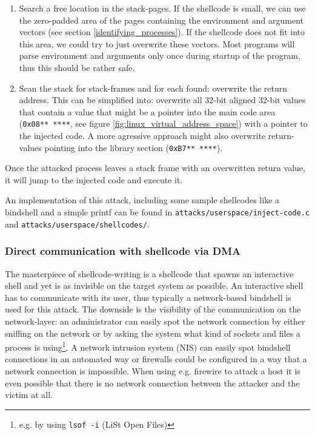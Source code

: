 \begin{enumerate}

	\item Search a free location in the stack-pages. If the shellcode is
		small, we can use the zero-padded area of the pages containing
		the environment and argument vectors (see section
		\ref{identifying_processes}). If the shellcode does not fit into
		this area, we could try to just overwrite these vectors. Most
		programs will parse environment and arguments only once during
		startup of the program, thus this should be rather safe.

	\item Scan the stack for stack-frames and for each found: overwrite the
		return address. This can be simplified into: overwrite all
		32-bit aligned 32-bit values that contain a value that might be
		a pointer into the main code area (\texttt{0x08**~****}, see
		figure \ref{fig:linux_virtual_address_space}) with a pointer to
		the injected code.  A more agressive approach might also
		overwrite return-values pointing into the library section
		(\texttt{0xB7**~****}).

\end{enumerate}

Once the attacked process leaves a stack frame with an overwritten return value,
it will jump to the injected code and execute it.

An implementation of this attack, including some sample shellcodes like a
bindshell and a simple printf can be found in
\texttt{attacks/userspace/inject-code.c} and \linebreak
\texttt{attacks/userspace/shellcodes/}.


\subsubsection{Direct communication with shellcode via DMA}

The masterpiece of shellcode-writing is a shellcode that spawns an interactive
shell and yet is as invisible on the target system as possible. An interactive
shell has to communicate with its user, thus typically a network-based bindshell
is used for this attack. The downside is the visibility of the communication on
the network-layer: an administrator can easily spot the network connection by
either sniffing on the network or by asking the system what kind of sockets and
files a process is using\footnote{e.g. by using \texttt{lsof -i} (LiSt Open
Files)}. A network intrusion system (NIS) can easily spot bindshell connections
in an automated way or firewalls could be configured in a way that a network
connection is impossible. When using e.g. firewire to attack a host it is even
possible that there is no network connection between the attacker and the victim
at all.

